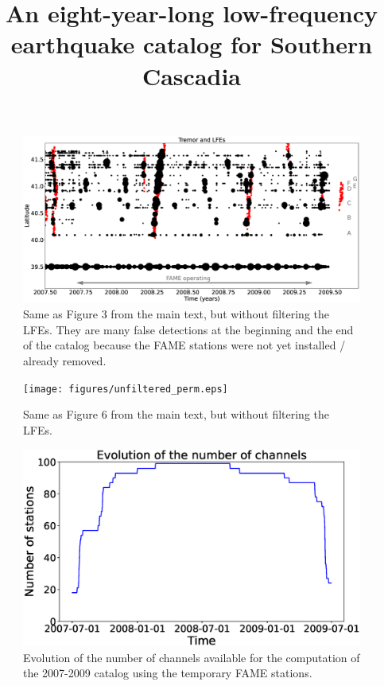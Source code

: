 \documentclass[draft]{agujournal2019}
\begin{document}
\title{An eight-year-long low-frequency earthquake catalog for Southern Cascadia}




\begin{figure}[hbt!]
\noindent\includegraphics[width=\textwidth, trim={0cm 0cm 0cm 0cm},clip]{figures/unfiltered_FAME.eps}
\caption{Same as Figure 3 from the main text, but without filtering the LFEs. They are many false detections at the beginning and the end of the catalog because the FAME stations were not yet installed / already removed.}
\label{pngfiguresample}
\end{figure}

\begin{figure}[hbt!]
\noindent\texttt{[image: figures/unfiltered\_perm.eps]}
\caption{Same as Figure 6 from the main text, but without filtering the LFEs.}
\label{pngfiguresample}
\end{figure}

\begin{figure}[hbt!]
\noindent\includegraphics[width=\textwidth, trim={0cm 0cm 0cm 0cm},clip]{figures/timeline_FAME.eps}
\caption{Evolution of the number of channels available for the computation of the 2007-2009 catalog using the temporary FAME stations.}
\label{pngfiguresample}
\end{figure}
\end{document}
